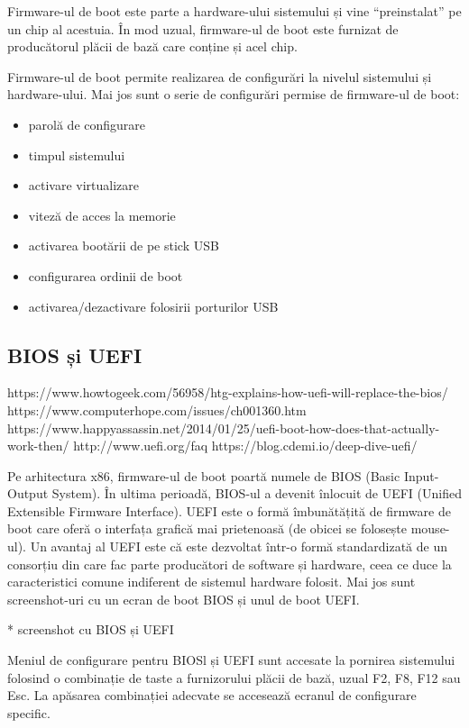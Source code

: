 Firmware-ul de boot este parte a hardware-ului sistemului și vine “preinstalat”
pe un chip al acestuia. În mod uzual, firmware-ul de boot este furnizat de
producătorul plăcii de bază care conține și acel chip.

Firmware-ul de boot permite realizarea de configurări la nivelul sistemului și
hardware-ului. Mai jos sunt o serie de configurări permise de firmware-ul de
boot:

\begin{itemize}
	\item parolă de configurare
	\item timpul sistemului
	\item activare virtualizare
	\item viteză de acces la memorie
	\item activarea bootării de pe stick USB
	\item configurarea ordinii de boot
	\item activarea/dezactivare folosirii porturilor USB
\end{itemize}

\subsection{BIOS și UEFI}
\label{sec:boot-firmware-bios}

https://www.howtogeek.com/56958/htg-explains-how-uefi-will-replace-the-bios/
https://www.computerhope.com/issues/ch001360.htm
https://www.happyassassin.net/2014/01/25/uefi-boot-how-does-that-actually-work-then/
http://www.uefi.org/faq
https://blog.cdemi.io/deep-dive-uefi/

Pe arhitectura x86, firmware-ul de boot poartă numele de BIOS (Basic
Input-Output System). În ultima perioadă, BIOS-ul a devenit înlocuit de UEFI
(Unified Extensible Firmware Interface). UEFI este o formă îmbunătățită de
firmware de boot care oferă o interfața grafică mai prietenoasă (de obicei se
folosește mouse-ul). Un avantaj al UEFI este că este dezvoltat într-o formă
standardizată de un consorțiu din care fac parte producători de software și
hardware, ceea ce duce la caracteristici comune indiferent de sistemul hardware
folosit. Mai jos sunt screenshot-uri cu un ecran de boot BIOS și unul de boot
UEFI.

* screenshot cu BIOS și UEFI

Meniul de configurare pentru BIOSl și UEFI sunt accesate la pornirea sistemului
folosind o combinație de taste a furnizorului plăcii de bază, uzual F2, F8, F12
sau Esc. La apăsarea combinației adecvate se accesează ecranul de configurare
specific.

